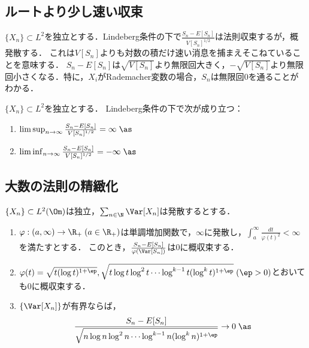 \documentclass[uplatex,dvipdfmx]{jsreport}
\begin{document}
\subsection{ルートより少し速い収束}

\begin{tcolorbox}[colframe=ForestGreen, colback=ForestGreen!10!white,breakable,colbacktitle=ForestGreen!40!white,coltitle=black,fonttitle=\bfseries\sffamily,
title=]
    $\{X_n\}\subset L^2$を独立とする．Lindeberg条件の下で$\frac{S_n-E[S_n]}{V[S_n]^{1/2}}$は法則収束するが，概発散する．
    これは$V[S_n]$よりも対数の積だけ速い消息を捕まえそこねていることを意味する．
    $S_n-E[S_n]$は$\sqrt{V[S_n]}$より無限回大きく，$-\sqrt{V[S_n]}$より無限回小さくなる．特に，$X_i$がRademacher変数の場合，$S_n$は無限回$0$を通ることがわかる．
\end{tcolorbox}

\begin{theorem}
    $\{X_n\}\subset L^2$を独立とする．
    Lindeberg条件の下で次が成り立つ：
    \begin{enumerate}
        \item $\limsup_{n\to\infty}\frac{S_n-E[S_n]}{V[S_n]^{1/2}}=\infty\;\as$
        \item $\liminf_{n\to\infty}\frac{S_n-E[S_n]}{V[S_n]^{1/2}}=-\infty\;\as$
    \end{enumerate}
\end{theorem}

\subsection{大数の法則の精緻化}

\begin{theorem}
    $\{X_n\}\subset L^2(\Om)$は独立，$\sum_{n\in\N}\Var[X_n]$は発散するとする．
    \begin{enumerate}
        \item $\varphi:(a,\infty)\to\R_+\;(a\in\R_+)$は単調増加関数で，$\infty$に発散し，$\int^\infty_a\frac{dt}{\varphi(t)^2}<\infty$を満たすとする．
        このとき，$\frac{S_n-E[S_n]}{\varphi(\Var[S_n])}$は$0$に概収束する．
        \item $\varphi(t)=\sqrt{t(\log t)^{1+\ep}},\sqrt{t\log t\log^2t\cdots\log^{k-1}t(\log^kt)^{1+\ep}}\;(\ep>0)$とおいても$0$に概収束する．
        \item $\{\Var[X_n]\}$が有界ならば，
        \[\frac{S_n-E[S_n]}{\sqrt{n\log n\log^2n\cdots\log^{k-1}n(\log^kn)^{1+\ep}}}\to0\;\as\]
    \end{enumerate}
\end{theorem}
\end{document}
